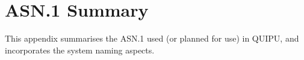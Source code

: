 \chapter {ASN.1 Summary}

This appendix summarises the ASN.1 used (or planned for use) in QUIPU, and
incorporates the system naming aspects.

